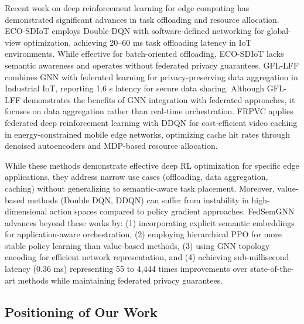 \documentclass[conference]{IEEEtran}
\begin{document}
	Recent work on deep reinforcement learning for edge computing has demonstrated significant advances in task offloading and resource allocation. ECO-SDIoT employs Double DQN with software-defined networking for global-view optimization, achieving 20--60 ms task offloading latency in IoT environments. While effective for batch-oriented offloading, ECO-SDIoT lacks semantic awareness and operates without federated privacy guarantees. GFL-LFF combines GNN with federated learning for privacy-preserving data aggregation in Industrial IoT, reporting 1.6 s latency for secure data sharing. Although GFL-LFF demonstrates the benefits of GNN integration with federated approaches, it focuses on data aggregation rather than real-time orchestration. FRPVC applies federated deep reinforcement learning with DDQN for cost-efficient video caching in energy-constrained mobile edge networks, optimizing cache hit rates through denoised autoencoders and MDP-based resource allocation.
	
	While these methods demonstrate effective deep RL optimization for specific edge applications, they address narrow use cases (offloading, data aggregation, caching) without generalizing to semantic-aware task placement. Moreover, value-based methods (Double DQN, DDQN) can suffer from instability in high-dimensional action spaces compared to policy gradient approaches. FedSemGNN advances beyond these works by: (1) incorporating explicit semantic embeddings for application-aware orchestration, (2) employing hierarchical PPO for more stable policy learning than value-based methods, (3) using GNN topology encoding for efficient network representation, and (4) achieving sub-millisecond latency (0.36 ms) representing 55 to 4,444 times improvements over state-of-the-art methods while maintaining federated privacy guarantees.
	
	
	\subsection{Positioning of Our Work}
	
\end{document}
